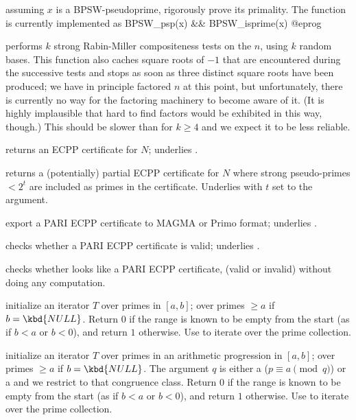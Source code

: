  assuming $x$ is a BPSW-pseudoprime, rigorously
prove its primality. The function  is currently implemented
as
\bprog
 BPSW_psp(x) && BPSW_isprime(x)
@eprog

 performs $k$ strong Rabin-Miller
compositeness tests on the  $n$, using $k$ random bases. This
function also caches square roots of $-1$ that are encountered during the
successive tests and stops as soon as three distinct square roots have been
produced; we have in principle factored $n$ at this point, but
unfortunately, there is currently no way for the factoring machinery to
become aware of it. (It is highly implausible that hard to find factors
would be exhibited in this way, though.) This should be slower than
 for $k\geq 4$ and we expect it to be less reliable.

 returns an ECPP certificate for  $N$;
underlies .

 returns a (potentially)
partial ECPP certificate for  $N$ where strong pseudo-primes $< 2^t$
are included as primes in the certificate. Underlies  with
$t$ set to the  argument.

 export a PARI ECPP certificate to
MAGMA or Primo format; underlies .

 checks whether a PARI ECPP certificate
is valid; underlies .

 checks whether  looks
like a PARI ECPP certificate, (valid or invalid) without doing any computation.


 initialize an
iterator $T$ over primes in $[a,b]$; over primes $\geq a$ if $b =
\kbd{NULL}$. Return $0$ if the range is known to be empty from the start
(as if $b < a$ or $b < 0$), and return $1$ otherwise. Use 
to iterate over the prime collection.

 initialize an
iterator $T$ over primes in an arithmetic progression in $[a,b]$;
over primes $\geq a$ if $b = \kbd{NULL}$. The argument $q$ is either a
 ($p \equiv a \pmod{q}$) or a  
and we restrict to that congruence class. Return $0$ if the range is known to
be empty from the start (as if $b < a$ or $b < 0$), and return $1$ otherwise.
Use  to iterate over the prime collection.

